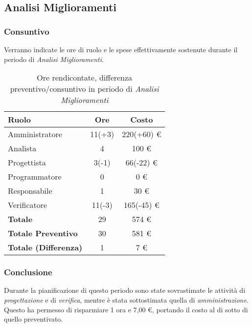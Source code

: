 \subsection{Analisi Miglioramenti}
\subsubsection{Consuntivo}
Verranno indicate le ore di ruolo e le spese effettivamente sostenute durante il periodo di \textit{Analisi Miglioramenti}.

\begin{table}[H]
	\centering
	\begin{tabular}{ l c c }
		\textbf{Ruolo} & \textbf{Ore} & \textbf{Costo} \\
		\hline
		Amministratore & 11(+3) & 220(+60) \euro{} \\
		Analista & 4 & 100 \euro{} \\
		Progettista & 3(-1) & 66(-22) \euro{} \\
		Programmatore & 0 & 0 \euro{} \\
		Responsabile & 1 & 30 \euro{} \\
		Verificatore & 11(-3) & 165(-45) \euro{} \\
		\hline
		\textbf{Totale \glossaryItem{Consuntivo}} & 29 & 574 \euro{} \\
		\hline
		\textbf{Totale Preventivo} & 30 & 581 \euro{} \\
		\hline
		\textbf{Totale (Differenza)} & 1 & 7 \euro{} \\
		\hline
	\end{tabular}
	\caption{Ore rendicontate, differenza preventivo/consuntivo in periodo di \textit{Analisi Miglioramenti}}
\end{table}



\subsubsection{Conclusione}
Durante la pianificazione di questo periodo sono state sovrastimate le attivit\`a di \textit{progettazione} e di \textit{verifica}, mentre \`e stata sottostimata quella di \textit{amministrazione}.
Questo ha permesso di risparmiare 1 ora e 7,00 \euro{}, portando il costo  al di sotto di quello preventivato.


\newpage


